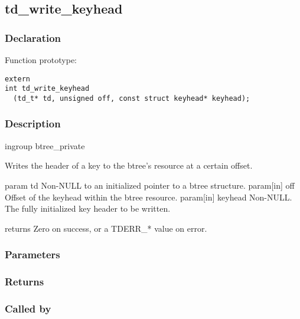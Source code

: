 
\newpage
\subsection{td\_write\_keyhead}
\subsubsection{Declaration} Function prototype:

\begin{verbatim}
extern
int td_write_keyhead
  (td_t* td, unsigned off, const struct keyhead* keyhead);
\end{verbatim}

\subsubsection{Description}


 ingroup btree\_private

 Writes the header of a key to the btree's resource at a certain offset.

 param td Non-NULL to an initialized pointer to a btree structure.
 param[in] off Offset of the keyhead within the btree resource.
 param[in] keyhead Non-NULL. The fully initialized key header to be written.

 returns Zero on success, or a TDERR\_* value on error.
 

\subsubsection{Parameters}
\subsubsection{Returns}
\subsubsection{Called by}
